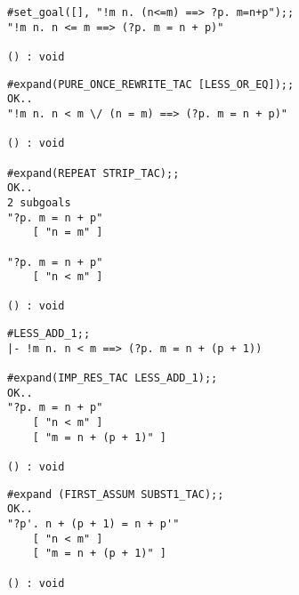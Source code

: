 




\vskip4mm
\begin{session}\begin{verbatim}
#set_goal([], "!m n. (n<=m) ==> ?p. m=n+p");;
"!m n. n <= m ==> (?p. m = n + p)"

() : void
\end{verbatim}\end{session}

\vskip4mm
\begin{session}\begin{verbatim}
#expand(PURE_ONCE_REWRITE_TAC [LESS_OR_EQ]);;
OK..
"!m n. n < m \/ (n = m) ==> (?p. m = n + p)"

() : void

#expand(REPEAT STRIP_TAC);;
OK..
2 subgoals
"?p. m = n + p"
    [ "n = m" ]

"?p. m = n + p"
    [ "n < m" ]

() : void
\end{verbatim}\end{session}


\vskip4mm
\begin{session}\begin{verbatim}
#LESS_ADD_1;;
|- !m n. n < m ==> (?p. m = n + (p + 1))

#expand(IMP_RES_TAC LESS_ADD_1);;
OK..
"?p. m = n + p"
    [ "n < m" ]
    [ "m = n + (p + 1)" ]

() : void
\end{verbatim}\end{session}

\vskip4mm
\begin{session}\begin{verbatim}
#expand (FIRST_ASSUM SUBST1_TAC);;
OK..
"?p'. n + (p + 1) = n + p'"
    [ "n < m" ]
    [ "m = n + (p + 1)" ]

() : void
\end{verbatim}\end{session}


